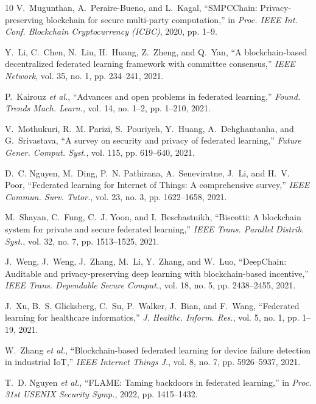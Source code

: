 \documentclass[12pt,a4paper,onecolumn]{article}
\begin{document}
\begin{thebibliography}{10}
V.~Mugunthan, A.~Peraire-Bueno, and L.~Kagal,
``SMPCChain: Privacy-preserving blockchain for secure multi-party computation,''
in \emph{Proc. IEEE Int. Conf. Blockchain Cryptocurrency (ICBC)}, 2020, pp. 1--9.

Y.~Li, C.~Chen, N.~Liu, H.~Huang, Z.~Zheng, and Q.~Yan,
``A blockchain-based decentralized federated learning framework with committee consensus,''
\emph{IEEE Network}, vol. 35, no. 1, pp. 234--241, 2021.

P.~Kairouz \emph{et al.},
``Advances and open problems in federated learning,''
\emph{Found. Trends Mach. Learn.}, vol. 14, no. 1--2, pp. 1--210, 2021.

V.~Mothukuri, R.~M. Parizi, S.~Pouriyeh, Y.~Huang, A.~Dehghantanha, and G.~Srivastava,
``A survey on security and privacy of federated learning,''
\emph{Future Gener. Comput. Syst.}, vol. 115, pp. 619--640, 2021.

D.~C. Nguyen, M.~Ding, P.~N. Pathirana, A.~Seneviratne, J.~Li, and H.~V. Poor,
``Federated learning for Internet of Things: A comprehensive survey,''
\emph{IEEE Commun. Surv. Tutor.}, vol. 23, no. 3, pp. 1622--1658, 2021.

M.~Shayan, C.~Fung, C.~J. Yoon, and I.~Beschastnikh,
``Biscotti: A blockchain system for private and secure federated learning,''
\emph{IEEE Trans. Parallel Distrib. Syst.}, vol. 32, no. 7, pp. 1513--1525, 2021.

J.~Weng, J.~Weng, J.~Zhang, M.~Li, Y.~Zhang, and W.~Luo,
``DeepChain: Auditable and privacy-preserving deep learning with blockchain-based incentive,''
\emph{IEEE Trans. Dependable Secure Comput.}, vol. 18, no. 5, pp. 2438--2455, 2021.

J.~Xu, B.~S. Glicksberg, C.~Su, P.~Walker, J.~Bian, and F.~Wang,
``Federated learning for healthcare informatics,''
\emph{J. Healthc. Inform. Res.}, vol. 5, no. 1, pp. 1--19, 2021.

W.~Zhang \emph{et al.},
``Blockchain-based federated learning for device failure detection in industrial IoT,''
\emph{IEEE Internet Things J.}, vol. 8, no. 7, pp. 5926--5937, 2021.

T.~D. Nguyen \emph{et al.},
``FLAME: Taming backdoors in federated learning,''
in \emph{Proc. 31st USENIX Security Symp.}, 2022, pp. 1415--1432.


\end{thebibliography}
\end{document}
